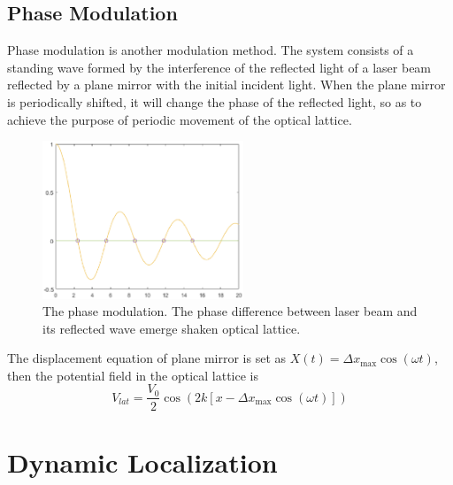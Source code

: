 \documentclass[
 reprint,
amsmath,amssymb,
aps,
pra,
floatfix,
]{revtex4-2}
\begin{document}
\subsection{Phase Modulation}
Phase modulation is another modulation method.
The system consists of a standing wave formed by the interference of the reflected light of a laser beam reflected by a plane mirror with the initial incident light. 
When the plane mirror is periodically shifted, it will change the phase of the reflected light,
so as to achieve the purpose of periodic movement of the optical lattice.

\begin{figure}[b]
  \includegraphics[width = 6cm]{fig4.eps}
  \caption{\label{fig4} The phase modulation. The phase difference between laser beam and its reflected wave emerge shaken optical lattice.}
\end{figure}

The displacement equation of plane mirror is set as $X(t)=\Delta x_{\max } \cos (\omega t)$, then the potential field in the optical lattice is
\begin{equation}
  V_{l a t}=\frac{V_{0}}{2} \cos \left(2 k\left[x-\Delta x_{\max } \cos (\omega t)\right]\right)
\end{equation}


\section{Dynamic Localization}
\end{document}
